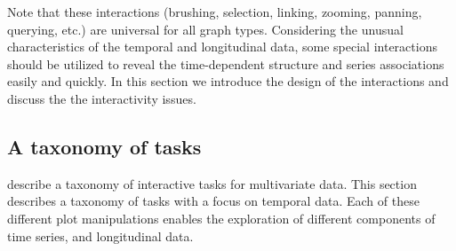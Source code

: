 \documentclass[12pt]{article}
\begin{document}
Note that these interactions  (brushing, selection, linking, zooming,
panning, querying, etc.) are universal for all graph types. Considering
the unusual characteristics of the temporal and longitudinal data,
some special interactions should be utilized to reveal the time-dependent
structure and series associations easily and quickly. In this section
we introduce the design of the interactions and discuss the the interactivity
issues.


\subsection{A taxonomy of tasks\label{sub:Special-interactions}}

\citet{Buja1996} describe a taxonomy of interactive tasks
for multivariate data. This section describes a taxonomy
of tasks with a focus on temporal data. Each of these
different plot manipulations enables the exploration of
different components of time series, and longitudinal data.
\end{document}
